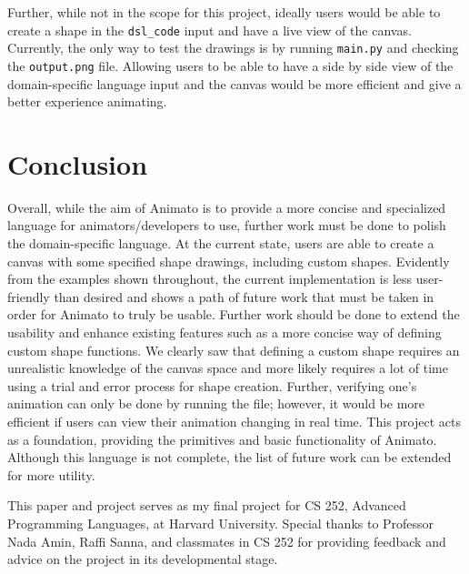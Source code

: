\documentclass[acmsmall,screen]{acmart}
\begin{document}
Further, while not in the scope for this project, ideally users would be able to create a shape in the \texttt{dsl\_code} input and have a live view of the canvas.
Currently, the only way to test the drawings is by running \texttt{main.py} and checking the \texttt{output.png} file. 
Allowing users to be able to have a side by side view of the domain-specific language input and the canvas would be more efficient and give a better experience animating.

\section{Conclusion}
Overall, while the aim of Animato is to provide a more concise and specialized language for animators/developers to use, further work must be done to polish the domain-specific language.
At the current state, users are able to create a canvas with some specified shape drawings, including custom shapes.
Evidently from the examples shown throughout, the current implementation is less user-friendly than desired and shows a path of future work that must be taken in order for Animato to truly be usable.
Further work should be done to extend the usability and enhance existing features such as a more concise way of defining custom shape functions.
We clearly saw that defining a custom shape requires an unrealistic knowledge of the canvas space and more likely requires a lot of time using a trial and error process for shape creation.
Further, verifying one's animation can only be done by running the file; however, it would be more efficient if users can view their animation changing in real time.
This project acts as a foundation, providing the primitives and basic functionality of Animato. 
Although this language is not complete, the list of future work can be extended for more utility.

\begin{acks}
This paper and project serves as my final project for CS 252, Advanced Programming Languages, at Harvard University. Special thanks to Professor Nada Amin, Raffi Sanna, and classmates in CS 252 for providing feedback and advice on the project in its developmental stage.
\end{acks}



\end{document}
